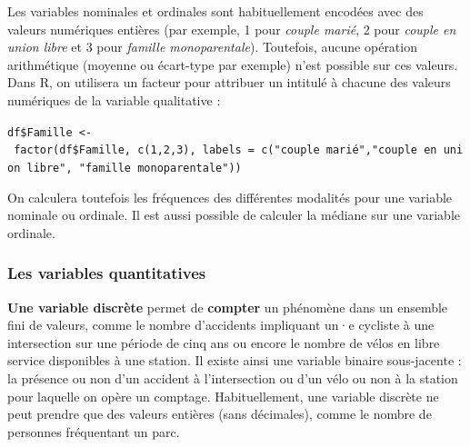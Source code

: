 \documentclass[
  11pt,
  french,
]{book}
\makeatletter
\newenvironment{kframev}{%
\medskip{}
\setlength{\fboxsep}{.8em}
 \def\at@end@of@kframev{}%
 \ifinner\ifhmode%
  \def\at@end@of@kframev{\end{minipage}}%
  \begin{minipage}{\columnwidth}%
 \fi\fi%
 \def\FrameCommand##1{\hskip\@totalleftmargin \hskip-\fboxsep
 \colorbox{shadebluecolor}{##1}\hskip-\fboxsep
     \hskip-\linewidth \hskip-\@totalleftmargin \hskip\columnwidth}%
 \MakeFramed {\advance\hsize-\width
   \@totalleftmargin\z@ \linewidth\hsize
   \@setminipage}}%
 {\par\unskip\endMakeFramed%
 \at@end@of@kframev}
\newenvironment{rmdblock}[1]
  {
  \begin{itemize}
  \renewcommand{\labelitemi}{
    \raisebox{-.7\height}[0pt][0pt]{
      {\setkeys{Gin}{width=3em,keepaspectratio}\texttt{[image: images/\#1]}}
    }
  }
  \setlength{\fboxsep}{1em}
  \begin{kframev}
  \small
  \item
  }
  {
  \end{kframev}
  \end{itemize}
  }
\newenvironment{bloc_attention}
  {\begin{rmdblock}{attention}}
  {\end{rmdblock}}
\makeatother
\begin{document}
\begin{bloc_attention}
Les variables nominales et ordinales sont habituellement encodées avec des valeurs numériques entières (par exemple, 1 pour \emph{couple marié}, 2 pour \emph{couple en union libre} et 3 pour \emph{famille monoparentale}). Toutefois, aucune opération arithmétique (moyenne ou écart-type par exemple) n'est possible sur ces valeurs. Dans R, on utilisera un facteur pour attribuer un intitulé à chacune des valeurs numériques de la variable qualitative :

\texttt{df\$Famille\ \textless{}-\ factor(df\$Famille,\ c(1,2,3),\ labels\ =\ c("couple\ marié","couple\ en\ union\ libre",\ "famille\ monoparentale"))}

On calculera toutefois les fréquences des différentes modalités pour une variable nominale ou ordinale. Il est aussi possible de calculer la médiane sur une variable ordinale.

\end{bloc_attention}

\hypertarget{sect02122}{%
\subsubsection{Les variables quantitatives}\label{sect02122}}

\textbf{Une variable discrète} permet de \textbf{compter} un phénomène dans un ensemble fini de valeurs, comme le nombre d'accidents impliquant un·e cycliste à une intersection sur une période de cinq ans ou encore le nombre de vélos en libre service disponibles à une station. Il existe ainsi une variable binaire sous-jacente : la présence ou non d'un accident à l'intersection ou d'un vélo ou non à la station pour laquelle on opère un comptage. Habituellement, une variable discrète ne peut prendre que des valeurs entières (sans décimales), comme le nombre de personnes fréquentant un parc.
\end{document}
